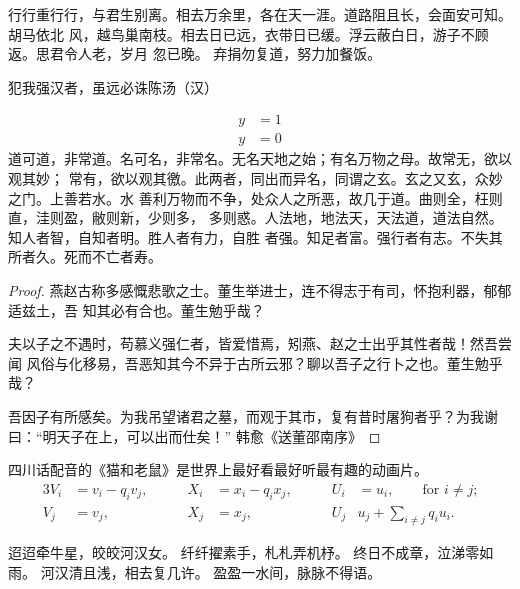 \documentclass[../Main/thesis.tex]{subfiles}
\begin{document}
行行重行行，与君生别离。相去万余里，各在天一涯。道路阻且长，会面安可知。胡马依北
风，越鸟巢南枝。相去日已远，衣带日已缓。浮云蔽白日，游子不顾返。思君令人老，岁月
忽已晚。  弃捐勿复道，努力加餐饭。

\begin{theorem}\label{the:theorem1}
  犯我强汉者，虽远必诛\hfill \pozhehao 陈汤（汉）
\end{theorem}
\begin{subequations}
  \begin{align}
    y & = 1 \\
    y & = 0
  \end{align}
\end{subequations}
道可道，非常道。名可名，非常名。无名天地之始；有名万物之母。故常无，欲以观其妙；
常有，欲以观其徼。此两者，同出而异名，同谓之玄。玄之又玄，众妙之门。上善若水。水
善利万物而不争，处众人之所恶，故几于道。曲则全，枉则直，洼则盈，敝则新，少则多，
多则惑。人法地，地法天，天法道，道法自然。知人者智，自知者明。胜人者有力，自胜
者强。知足者富。强行者有志。不失其所者久。死而不亡者寿。

\begin{proof}
  燕赵古称多感慨悲歌之士。董生举进士，连不得志于有司，怀抱利器，郁郁适兹土，吾
  知其必有合也。董生勉乎哉？

  夫以子之不遇时，苟慕义强仁者，皆爱惜焉，矧燕、赵之士出乎其性者哉！然吾尝闻
  风俗与化移易，吾恶知其今不异于古所云邪？聊以吾子之行卜之也。董生勉乎哉？

  吾因子有所感矣。为我吊望诸君之墓，而观于其市，复有昔时屠狗者乎？为我谢
  曰：“明天子在上，可以出而仕矣！” \hfill\pozhehao 韩愈《送董邵南序》
\end{proof}

\begin{corollary}
  四川话配音的《猫和老鼠》是世界上最好看最好听最有趣的动画片。
  \begin{alignat}{3}
    V_i & =v_i - q_i v_j, & \qquad X_i                   & = x_i - q_i x_j,
        & \qquad U_i      & = u_i,
    \qquad \text{for $i\ne j$;}\label{eq:B}                                 \\
    V_j & = v_j,          & \qquad X_j                   & = x_j,
        & \qquad U_j      & u_j + \sum_{i\ne j} q_i u_i.
  \end{alignat}
\end{corollary}

迢迢牵牛星，皎皎河汉女。
纤纤擢素手，札札弄机杼。
终日不成章，泣涕零如雨。
河汉清且浅，相去复几许。
盈盈一水间，脉脉不得语。
\end{document}
